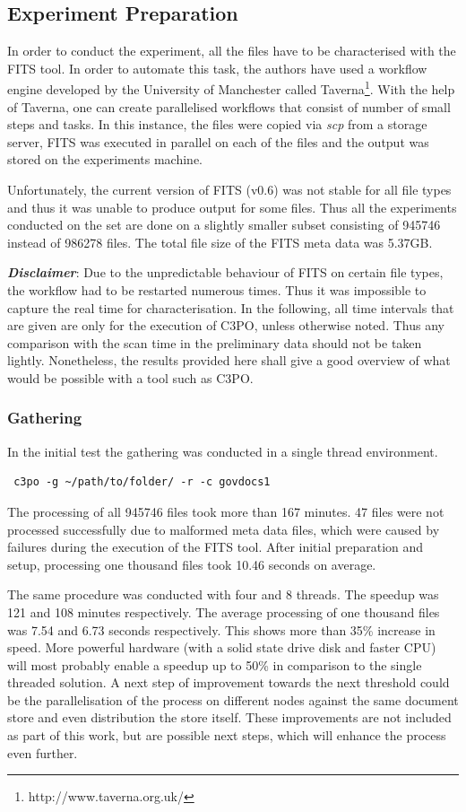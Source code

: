 \subsection{Experiment Preparation}
In order to conduct the experiment, all the files have to be characterised with the FITS tool.
In order to automate this task, the authors have used a workflow engine developed by the University of Manchester called Taverna\footnote{http://www.taverna.org.uk/}.
With the help of Taverna, one can create parallelised workflows that consist of number of small steps and tasks.
In this instance, the files were copied via \textit{scp} from a storage server, FITS was executed in parallel on each of the files and the output was stored on the experiments machine.

Unfortunately, the current version of FITS (v0.6) was not stable for all file types and thus it was unable to produce output for some files.
Thus all the experiments conducted on the set are done on a slightly smaller subset consisting of 945746 instead of 986278 files. The total file size of the FITS meta data was 5.37GB.

\textbf{\textit{Disclaimer}}: Due to the unpredictable behaviour of FITS on certain file types, the workflow had to be restarted numerous times.
Thus it was impossible to capture the real time for characterisation.
In the following, all time intervals that are given are only for the execution of C3PO, unless otherwise noted.
Thus any comparison with the scan time in the preliminary data should not be taken lightly.
Nonetheless, the results provided here shall give a good overview of what would be possible with a tool such as C3PO.

\subsubsection{Gathering}
In the initial test the gathering was conducted in a single thread environment. 

\begin{verbatim}
 c3po -g ~/path/to/folder/ -r -c govdocs1
\end{verbatim}

The processing of all 945746 files took more than 167 minutes.
47 files were not processed successfully due to malformed meta data files, which were caused by failures during the execution of the FITS tool.
After initial preparation and setup, processing one thousand files took 10.46 seconds on average.

The same procedure was conducted with four and 8 threads.
The speedup was 121 and 108 minutes respectively.
The average processing of one thousand files was 7.54 and 6.73  seconds respectively.
This shows more than 35\% increase in speed.
More powerful hardware (with a solid state drive disk and faster CPU) will most probably enable a speedup up to 50\% in comparison to the single threaded solution.
A next step of improvement towards the next threshold could be the parallelisation of the process on different nodes against the same document store and even distribution the store itself.
These improvements are not included as part of this work, but are possible next steps, which will enhance the process even further.

